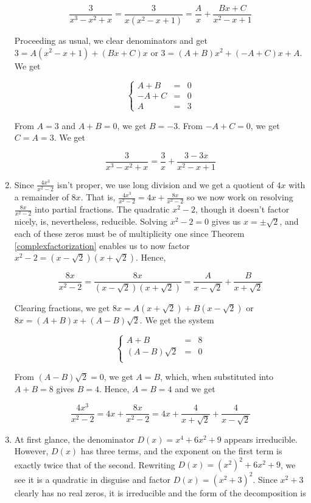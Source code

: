 \begin{ex}
\begin{enumerate}
\[\dfrac{3}{x^3-x^2+x} = \dfrac{3}{x\left(x^2-x+1\right)} = \dfrac{A}{x} + \dfrac{Bx+C}{x^2-x+1}\]

Proceeding as usual, we clear denominators and get $3 = A\left(x^2-x+1\right) + (Bx+C)x$ or $3 = (A+B)x^2 + (-A+C)x +A$.  We get

\[ \left\{ \begin{array}{rcr}  A+B & = & 0 \\ -A+C & = & 0 \\ A & = & 3 \end{array} \right.\]

From $A=3$ and $A+B = 0$, we get $B = -3$.  From $-A+C = 0$, we get $C = A = 3$.  We get


\[\dfrac{3}{x^3-x^2+x} =  \dfrac{3}{x} + \dfrac{3-3x}{x^2-x+1}\]

\item  Since $\frac{4x^3}{x^2-2}$ isn't proper, we use long division and we get a quotient of $4x$ with a remainder of $8x$.  That is, $\frac{4x^3}{x^2-2} = 4x + \frac{8x}{x^2-2}$ so we now work on resolving $\frac{8x}{x^2-2}$ into partial fractions.  The quadratic $x^2-2$, though it doesn't factor nicely, is, nevertheless, reducible. Solving $x^2-2 =0$ gives us $x = \pm \sqrt{2}$, and each of these zeros must be of multiplicity one since Theorem \ref{complexfactorization} enables us to now factor $x^2-2 = \left(x - \sqrt{2}\right)\left(x + \sqrt{2}\right)$. Hence,

\[ \dfrac{8x}{x^2-2} = \dfrac{8x}{ \left(x - \sqrt{2}\right)\left(x + \sqrt{2}\right)} = \dfrac{A}{x - \sqrt{2}} + \dfrac{B}{x + \sqrt{2}} \]

Clearing fractions, we get $8x = A\left(x + \sqrt{2}\right) + B\left(x - \sqrt{2}\right)$ or $8x = (A+B)x + (A-B)\sqrt{2}$.  We get the system


\[ \left\{ \begin{array}{rcr}  A+B & = & 8 \\ (A-B)\sqrt{2} & = & 0 \\ \end{array} \right.\]

From $(A-B)\sqrt{2}=0$, we get $A=B$, which, when substituted into $A+B = 8$ gives $B = 4$.  Hence, $A = B = 4$ and we get

\[\dfrac{4x^3}{x^2-2} = 4x + \dfrac{8x}{x^2-2} = 4x + \dfrac{4}{x + \sqrt{2}} + \dfrac{4}{x - \sqrt{2}}\]

\item  At first glance, the denominator $D(x) = x^4+6x^2+9$ appears irreducible. However, $D(x)$ has three terms, and the exponent on the first term is exactly twice that of the second.  Rewriting $D(x) = \left(x^2\right)^2 + 6x^2 + 9$, we see it is a quadratic in disguise and factor $D(x) = \left(x^2+3\right)^2$.  Since $x^2+3$ clearly has no real zeros, it is irreducible and the form of the decomposition is


\end{enumerate}
\end{ex}

